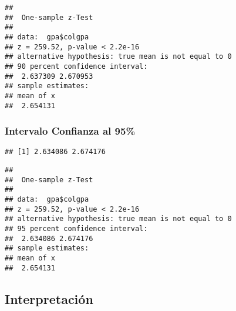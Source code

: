 \documentclass[
]{article}
\newenvironment{Shaded}{\begin{snugshade}}{\end{snugshade}}
\newcommand{\AttributeTok}[1]{\textcolor[rgb]{0.80,0.80,0.80}{#1}}
\newcommand{\CommentTok}[1]{\textcolor[rgb]{0.50,0.62,0.50}{#1}}
\newcommand{\FloatTok}[1]{\textcolor[rgb]{0.75,0.75,0.82}{#1}}
\newcommand{\FunctionTok}[1]{\textcolor[rgb]{0.94,0.94,0.56}{#1}}
\newcommand{\NormalTok}[1]{\textcolor[rgb]{0.80,0.80,0.80}{#1}}
\newcommand{\OtherTok}[1]{\textcolor[rgb]{0.94,0.94,0.56}{#1}}
\newcommand{\SpecialCharTok}[1]{\textcolor[rgb]{0.86,0.64,0.64}{#1}}
\begin{document}
\begin{verbatim}
## 
##  One-sample z-Test
## 
## data:  gpa$colgpa
## z = 259.52, p-value < 2.2e-16
## alternative hypothesis: true mean is not equal to 0
## 90 percent confidence interval:
##  2.637309 2.670953
## sample estimates:
## mean of x 
##  2.654131
\end{verbatim}

\hypertarget{intervalo-confianza-al-95-1}{%
\subsubsection{Intervalo Confianza al
95\%}\label{intervalo-confianza-al-95-1}}

\begin{Shaded}
\end{Shaded}

\begin{verbatim}
## [1] 2.634086 2.674176
\end{verbatim}

\begin{Shaded}
\end{Shaded}

\begin{verbatim}
## 
##  One-sample z-Test
## 
## data:  gpa$colgpa
## z = 259.52, p-value < 2.2e-16
## alternative hypothesis: true mean is not equal to 0
## 95 percent confidence interval:
##  2.634086 2.674176
## sample estimates:
## mean of x 
##  2.654131
\end{verbatim}

\hypertarget{interpretaciuxf3n}{%
\subsection{Interpretación}\label{interpretaciuxf3n}}
\end{document}
